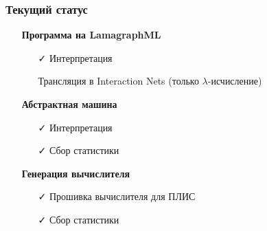 \documentclass[aspectratio=169]{beamer}
\begin{document}
\begin{frame}
    \frametitle{Текущий статус}

    \begin{itemize}
        \item[] \textbf{Программа на LamagraphML}
              \begin{itemize}
                  \item[\faCheck] Интерпретация
                  \item[\faCogs] Трансляция в Interaction Nets (только $\lambda$-исчисление)
              \end{itemize}
        \item[] \textbf{Абстрактная машина}
              \begin{itemize}
                  \item[\faCheck] Интерпретация
                  \item[\faCheck] Сбор статистики
              \end{itemize}
        \item[] \textbf{Генерация вычислителя}
              \begin{itemize}
                  \item[\faCheck] Прошивка вычислителя для ПЛИС
                  \item[\faCheck] Сбор статистики
              \end{itemize}
    \end{itemize}

\end{frame}
\end{document}
